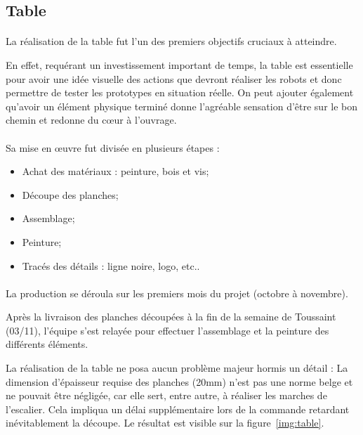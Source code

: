 \subsection{Table}
\paragraph{}
La réalisation de la table fut l'un des premiers objectifs cruciaux à atteindre. 

\noindent En effet, requérant un investissement important de temps, la table est essentielle pour avoir une idée visuelle des actions que devront réaliser les robots et donc permettre de tester les prototypes en situation réelle. On peut ajouter également qu'avoir un élément physique terminé donne l'agréable sensation d'être sur le bon chemin et redonne du cœur à l'ouvrage.

\paragraph{}
Sa mise en œuvre fut divisée en plusieurs étapes : 
\begin{itemize}
	\item Achat des matériaux : peinture, bois et vis;
	\item Découpe des planches;
	\item Assemblage;
	\item Peinture;
	\item Tracés des détails : ligne noire, logo, etc..
\end{itemize}

\paragraph{}
La production se déroula sur les premiers mois du projet (octobre à novembre).

\noindent Après la livraison des planches découpées à la fin de la semaine de Toussaint (03/11), l'équipe s'est relayée pour effectuer l'assemblage et la peinture des différents éléments.

\noindent La réalisation de la table ne posa aucun problème majeur hormis un détail : La dimension d'épaisseur requise des planches (20mm) n'est pas une norme belge et ne pouvait être négligée, car elle sert, entre autre, à réaliser les marches de l'escalier. Cela impliqua un délai supplémentaire lors de la commande retardant inévitablement la découpe. Le résultat est visible sur la figure~\ref{img:table}.

